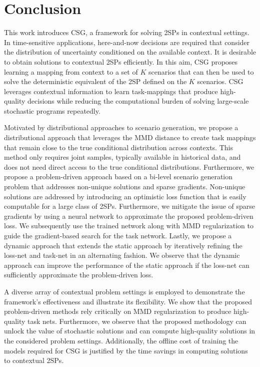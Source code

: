  \section{Conclusion}\label{section:conclusion}

 This work introduces CSG, a framework for solving 2SPs in contextual settings. In time-sensitive applications, here-and-now decisions are required that consider the distribution of uncertainty conditioned on the available context. It is desirable to obtain solutions to contextual 2SPs efficiently. In this aim, CSG proposes learning a mapping from context to a set of $K$ scenarios that can then be used to solve the deterministic equivalent of the 2SP defined on the $K$ scenarios. CSG leverages contextual information to learn task-mappings that produce high-quality decisions while reducing the computational burden of solving large-scale stochastic programs repeatedly.

 Motivated by distributional approaches to scenario generation, we propose a distributional approach that leverages the MMD distance to create task mappings that remain close to the true conditional distribution across contexts. This method only requires joint samples, typically available in historical data, and does not need direct access to the true conditional distributions. Furthermore, we propose a problem-driven approach based on a bi-level scenario generation problem that addresses non-unique solutions and sparse gradients. Non-unique solutions are addressed by introducing an optimistic loss function that is easily computable for a large class of 2SPs. Furthermore, we mitigate the issue of sparse gradients by using a neural network to approximate the proposed problem-driven loss. We subsequently use the trained network along with MMD regularization to guide the gradient-based search for the task network. Lastly, we propose a dynamic approach that extends the static approach by iteratively refining the loss-net and task-net in an alternating fashion. We observe that the dynamic approach can improve the performance of the static approach if the loss-net can sufficiently approximate the problem-driven loss. 


A diverse array of contextual problem settings is employed to demonstrate the framework's effectiveness and illustrate its flexibility. We show that the proposed problem-driven methods rely critically on MMD regularization to produce high-quality task nets. Furthermore, we observe that the proposed methodology can unlock the value of stochastic solutions and can compute high-quality solutions in the considered problem settings. Additionally, the offline cost of training the models required for CSG is justified by the time savings in computing solutions to contextual 2SPs. 

